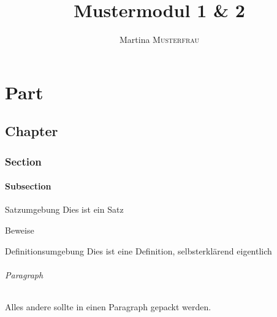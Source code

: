 \documentclass[red]{skript}
\author{Martina \textsc{Musterfrau}}
\title{Mustermodul 1 \& 2 \\\subtitleformat{Skript zum Mustermodul Dinge Bla}}
\begin{document}
\maketitle

\tableofcontents

\part{Part}
\chapter{Chapter}
\section{Section}
\subsection{Subsection}
\begin{satz}{Satzumgebung}
	Dies ist ein Satz
\end{satz}
\clearpage
\begin{beweis}
	Beweise
\end{beweis}

\begin{definition}{Definitionsumgebung}
	Dies ist eine Definition, selbsterklärend eigentlich
\end{definition}
\paragraph{Paragraph}
Alles andere sollte in einen Paragraph gepackt werden.
\end{document}
